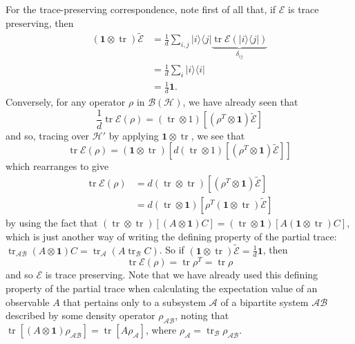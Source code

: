 \documentclass[fleqn]{article}
\begin{document}
For the trace-preserving correspondence, note first of all that, if \(\mathcal{E}\) is trace preserving, then
\[
  \begin{aligned}
    (\mathbf{1}\otimes\operatorname{tr})\widetilde{\mathcal{E}}
    &= \frac{1}{d}\sum_{i,j} |i\rangle\langle j| \underbrace{\operatorname{tr}\mathcal{E}(|i\rangle\langle j|)}_{\delta_{ij}}
  \\&= \frac{1}{d}\sum_i|i\rangle\langle i|
  \\&= \frac{1}{d}\mathbf{1}.
  \end{aligned}
\]
Conversely, for any operator \(\rho\) in \(\mathcal{B}(\mathcal{H})\), we have already seen that
\[
  \frac{1}{d}\operatorname{tr}\mathcal{E}(\rho)
  = (\operatorname{tr}\otimes1)\left[(\rho^T\otimes\mathbf{1})\widetilde{\mathcal{E}}\right]
\]
and so, tracing over \(\mathcal{H}'\) by applying \(\mathbf{1}\otimes\operatorname{tr}\), we see that
\[
  \operatorname{tr}\mathcal{E}(\rho)
  = (\mathbf{1}\otimes\operatorname{tr})\left[d(\operatorname{tr}\otimes1)\left[(\rho^T\otimes\mathbf{1})\widetilde{\mathcal{E}}\right]\right]
\]
which rearranges to give
\[
  \begin{aligned}
    \operatorname{tr}\mathcal{E}(\rho)
    &= d(\operatorname{tr}\otimes\operatorname{tr})\left[(\rho^T\otimes\mathbf{1})\widetilde{\mathcal{E}}\right]
  \\&= d(\operatorname{tr}\otimes\mathbf{1})\left[\rho^T(\mathbf{1}\otimes\operatorname{tr})\widetilde{\mathcal{E}}\right]
  \end{aligned}
\]
by using the fact that \((\operatorname{tr}\otimes\operatorname{tr})[(A\otimes\mathbf{1})C]=(\operatorname{tr}\otimes\mathbf{1})[A(\mathbf{1}\otimes\operatorname{tr})C]\), which is just another way of writing the defining property of the partial trace: \(\operatorname{tr}_{\mathcal{AB}}(A\otimes\mathbf{1})C=\operatorname{tr}_{\mathcal{A}}(A\operatorname{tr}_{\mathcal{B}}C)\).
So if \((\mathbf{1}\otimes\operatorname{tr})\widetilde{\mathcal{E}}=\frac{1}{d}\mathbf{1}\), then
\[
  \operatorname{tr}\mathcal{E}(\rho)
  = \operatorname{tr}\rho^T
  = \operatorname{tr}\rho
\]
and so \(\mathcal{E}\) is trace preserving.
Note that we have already used this defining property of the partial trace when calculating the expectation value of an observable \(A\) that pertains only to a subsystem \(\mathcal{A}\) of a bipartite system \(\mathcal{AB}\) described by some density operator \(\rho_{\mathcal{AB}}\), noting that \(\operatorname{tr}[(A\otimes\mathbf{1})\rho_{\mathcal{AB}}]=\operatorname{tr}[A\rho_{\mathcal{A}}]\), where \(\rho_{\mathcal{A}}=\operatorname{tr}_\mathcal{B}\rho_{\mathcal{AB}}\).
\end{document}

